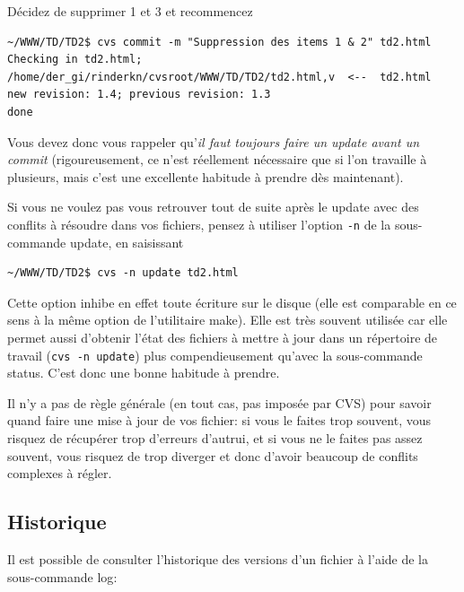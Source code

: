 \documentclass[11pt,a4paper]{article}
\begin{document}
\noindent Décidez de supprimer 1 et 3 et recommencez

{\small
\begin{verbatim}
~/WWW/TD/TD2$ cvs commit -m "Suppression des items 1 & 2" td2.html
Checking in td2.html;
/home/der_gi/rinderkn/cvsroot/WWW/TD/TD2/td2.html,v  <--  td2.html
new revision: 1.4; previous revision: 1.3
done
\end{verbatim}
}

Vous devez donc vous rappeler qu'\emph{il faut toujours faire un
\textsf{update} avant un \textsf{commit}} (rigoureusement, ce n'est
réellement nécessaire que si l'on travaille à plusieurs, mais c'est
une excellente habitude à prendre dès maintenant).

Si vous ne voulez pas vous retrouver tout de suite après le
\textsf{update} avec des conflits à résoudre dans vos fichiers, pensez
à utiliser l'option \texttt{-n} de la sous-commande \textsf{update},
en saisissant

{\small
\begin{verbatim}
~/WWW/TD/TD2$ cvs -n update td2.html
\end{verbatim}
}

Cette option inhibe en effet toute écriture sur le disque (elle est
comparable en ce sens à la même option de l'utilitaire
\textsf{make}). Elle est très souvent utilisée car elle permet aussi
d'obtenir l'état des fichiers à mettre à jour dans un répertoire de
travail (\texttt{cvs -n update}) plus compendieusement qu'avec la
sous-commande \textsf{status}. C'est donc une bonne habitude à
prendre.

Il n'y a pas de règle générale (en tout cas, pas imposée par CVS) pour
savoir quand faire une mise à jour de vos fichier: si vous le faites
trop souvent, vous risquez de récupérer trop d'erreurs d'autrui, et si
vous ne le faites pas assez souvent, vous risquez de trop diverger et
donc d'avoir beaucoup de conflits complexes à régler.


\subsection{Historique}\label{historique}

Il est possible de consulter l'historique des versions d'un fichier à
l'aide de la sous-commande \textsf{log}:
\end{document}
